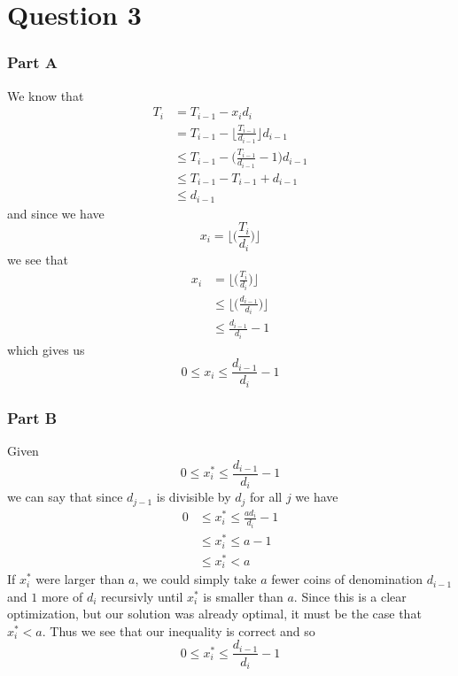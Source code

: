 \documentclass[12pt]{article}
\begin{document}
\section*{Question 3}
\subsubsection*{Part A}
We know that
\begin{align*}
T_i &= T_{i-1} - x_i d_i \\
&= T_{i-1} - \lfloor \frac{T_{i-1}}{d_{i-1}} \rfloor d_{i-1} \\
&\leq T_{i-1} - \bigg( \frac{T_{i-1}}{d_{i-1}} - 1 \bigg) d_{i-1} \\
&\leq T_{i-1} - T_{i-1} + d_{i-1} \\
&\leq d_{i-1}
\end{align*}
and since we have \[ x_i = \lfloor \bigg( \frac{T_i}{d_i} \bigg) \rfloor \] we see that
\begin{align*}
x_i &= \lfloor \bigg( \frac{T_i}{d_i} \bigg) \rfloor \\
&\leq \lfloor \bigg( \frac{d_{i-1}}{d_i} \bigg) \rfloor \\
&\leq \frac{d_{i-1}}{d_i} - 1
\end{align*}
which gives us \[ 0 \leq x_i \leq \frac{d_{i-1}}{d_i} - 1 \]

\subsubsection*{Part B}
Given \[ 0 \leq x^*_i \leq \frac{d_{i-1}}{d_i} - 1 \] we can say that since $d_{j-1}$ is divisible by $d_j$ for all $j$ we have
\begin{align*}
0 &\leq x^*_i \leq \frac{ad_i}{d_i} - 1 \\
&\leq x^*_i \leq a - 1 \\
&\leq x^*_i < a
\end{align*}
If $x^*_i$ were larger than $a$, we could simply take $a$ fewer coins of denomination $d_{i-1}$ and $1$ more of $d_i$ recursivly until $x^*_i$ is smaller than $a$. Since this is a clear optimization, but our solution was already optimal, it must be the case that $x^*_i < a$. Thus we see that our inequality is correct and so \[ 0 \leq x^*_i \leq \frac{d_{i-1}}{d_i} - 1 \]
\end{document}
